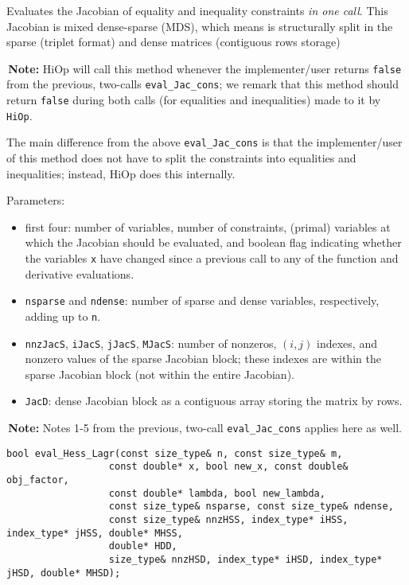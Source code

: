 \documentclass[11pt]{article}
\newcommand{\warningSymbol}{\raisebox{0.9\depth}{\danger}}
\newcommand{\warningcp}[1]{%
        \smallskip \noindent \textcolor{warningColorText}{\warningSymbol{}}\,\textbf{#1} %
    }
\newcommand{\Hi}{\texttt{HiOp}\xspace}
\begin{document}
\noindent Evaluates the Jacobian of equality and inequality constraints \textit{in one call}. This Jacobian is mixed dense-sparse (MDS), which means is structurally split in the sparse (triplet format) and dense matrices (contiguous rows storage)
   
\warningcp{Note:}   HiOp will call this method whenever the implementer/user returns \texttt{false} from the previous, two-calls \texttt{eval\_Jac\_cons}; we remark that this method should return  \texttt{false} during both calls (for equalities and inequalities) made to it by \Hi.
   
   
   
The main difference from the above \texttt{eval\_Jac\_cons} is that the implementer/user of this 
    method does not have to split the constraints into equalities and inequalities; instead,
    HiOp does this internally.
   
 
   Parameters:
    \begin{itemize}
    \item  first four: number of variables, number of constraints, (primal) variables at which the
    Jacobian should be evaluated, and boolean flag indicating whether the variables \texttt{x} have
    changed since a previous call to any of the function and derivative evaluations.
    \item   \texttt{nsparse} and \texttt{ndense}: number of sparse and dense variables, respectively, adding up to \texttt{n}.
     \item   \texttt{nnzJacS}, \texttt{iJacS}, \texttt{jJacS}, \texttt{MJacS}: number of nonzeros, $(i,j)$ indexes, and nonzero values of 
   the sparse Jacobian block; these indexes are within the sparse Jacobian block (not within 
    the entire Jacobian).
     \item  \texttt{JacD}: dense Jacobian block as a contiguous array storing the matrix by rows.
    \end{itemize}
   
\warningcp{Note:} Notes 1-5 from the previous, two-call \texttt{eval\_Jac\_cons} applies here as well.
    
\begin{lstlisting} 
bool eval_Hess_Lagr(const size_type& n, const size_type& m, 
			      const double* x, bool new_x, const double& obj_factor,
			      const double* lambda, bool new_lambda,
			      const size_type& nsparse, const size_type& ndense, 
			      const size_type& nnzHSS, index_type* iHSS, index_type* jHSS, double* MHSS, 
			      double* HDD,
			      size_type& nnzHSD, index_type* iHSD, index_type* jHSD, double* MHSD);
\end{lstlisting} 
\end{document}
